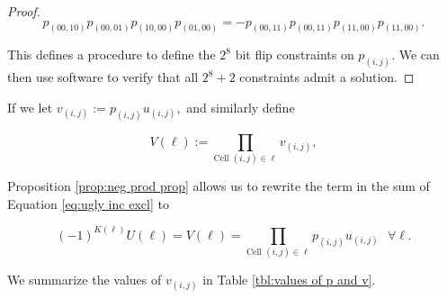 \documentclass[12pt]{article}
\theoremstyle{plain}
\theoremstyle{definition}
\theoremstyle{remark}
\theoremstyle{definition}
\begin{document}
\begin{proof}
\begin{equation}
    p_{(00,10)}p_{(00,01)}p_{(10,00)}p_{(01,00)} = -p_{(00,11)}p_{(00,11)}p_{(11,00)}p_{(11,00)}.
\end{equation}

This defines a procedure to define the $2^8$ bit flip constraints on $p_{(i,j)}$. We can then use software to verify that all $2^8 +2$ constraints admit a solution.



\end{proof}

If we let $v_{(i,j)} := p_{(i,j)}u_{(i,j)},$ and similarly define

$$V(\ell) := \prod_{\text{Cell } (i,j) \in \ell} v_{(i,j)},$$

Proposition \ref{prop:neg prod prop} allows us to rewrite the term in the sum of Equation \ref{eq:ugly inc excl} to

\begin{equation}
    (-1)^{K(\ell)}U(\ell) = V(\ell) = \prod_{\text{Cell }(i,j) \in \ell} p_{(i,j)}u_{(i,j)} \text{ $\forall \ell$}.
    \label{eq:term fix}
\end{equation}

We summarize the values of $v_{(i,j)}$ in Table \ref{tbl:values of p and v}.
\end{document}
